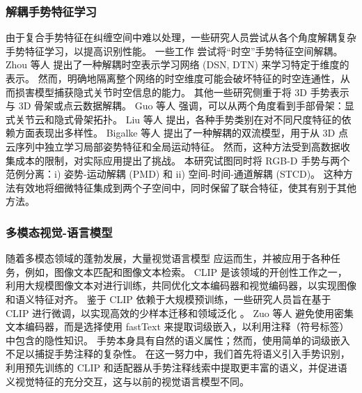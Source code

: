 \subsubsection{解耦手势特征学习}
由于复合手势特征在纠缠空间\cite{zhou2023unified,LI2024110536}中难以处理，一些研究人员尝试从各个角度解耦复杂手势特征学习，以提高识别性能。
一些工作\cite{zhou2022decoupling,LI2024110536} 尝试将“时空”手势特征空间解耦。
Zhou 等人 \cite{zhou2023unified} 提出了一种解耦时空表示学习网络 (DSN, DTN) 来学习特定于维度的表示。
然而，明确地隔离整个网络的时空维度可能会破坏特征的时空连通性，从而损害模型捕获隐式关节时空信息的能力。
其他一些研究侧重于将 3D 手势表示与 3D 骨架或点云数据解耦。
Guo 等人 \cite{GUO2021108044} 强调，可以从两个角度看到手部骨架：显式关节云和隐式骨架拓扑。
Liu 等人\cite{liu2020decoupled} 提出，各种手势类别在对不同尺度特征的依赖方面表现出多样性。
Bigalke 等人 \cite{bigalke2021fusing} 提出了一种解耦的双流模型，用于从 3D 点云序列中独立学习局部姿势特征和全局运动特征。
然而，这种方法受到高数据收集成本的限制，对实际应用提出了挑战。
本研究试图同时将 RGB-D 手势与两个范例分离：i) 姿势-运动解耦 (PMD) 和 ii) 空间-时间-通道解耦 (STCD)。
这种方法有效地将细微特征集成到两个子空间中，同时保留了联合特征，使其有别于其他方法。

\subsubsection{多模态视觉-语言模型}
随着多模态领域的蓬勃发展，大量视觉语言模型 \cite{radford2021learning, li2022blip} 应运而生，并被应用于各种任务，例如，图像文本匹配和图像文本检索。
CLIP \cite{radford2021learning} 是该领域的开创性工作之一，利用大规模图像文本对进行训练，共同优化文本编码器和视觉编码器，以实现图像和语义特征对齐。
鉴于 CLIP 依赖于大规模预训练，一些研究人员旨在基于 CLIP 进行微调，以实现高效的少样本迁移和领域泛化 \cite{gao2024clip}。
Zuo 等人 \cite{zuo2023natural} 避免使用密集文本编码器，而是选择使用 fastText 来提取词级嵌入，以利用注释（符号标签）中包含的隐性知识。
手势本身具有自然的语义属性；然而，使用简单的词级嵌入不足以捕捉手势注释的复杂性。
在这一努力中，我们首先将语义引入手势识别，利用预先训练的 CLIP 和适配器从手势注释线索中提取更丰富的语义，并促进语义视觉特征的充分交互，这与以前的视觉语言模型不同。





